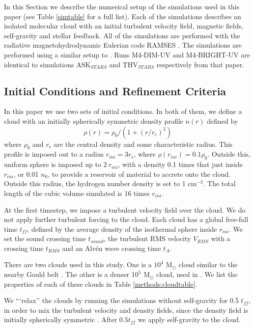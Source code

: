 \documentclass[a4paper,fleqn,usenatbib]{mnras}
\newcommand{\Msolar}{M$_{\odot}$\xspace}
\begin{document}
In this Section we describe the numerical setup of the simulations used in this paper (see Table \ref{simtable} for a full list). Each of the simulations describes an isolated molecular cloud with an initial turbulent velocity field, magnetic fields, self-gravity and stellar feedback. All of the simulations are performed with the radiative magnetohydrodynamic Eulerian \AMR code \textsc{RAMSES} \citep{Teyssier2002,Fromang2006,Rosdahl2013}. The simulations are performed using a similar setup to \citet{Geen2018}. Runs M4-DIM-UV and M4-BRIGHT-UV are identical to simulations ASK$_{STARS}$ and THV$_{STARS}$ respectively from that paper.

\subsection{Initial Conditions and Refinement Criteria}

In this paper we use two sets of initial conditions. In both of them, we define a cloud with an initially spherically symmetric density profile $n(r)$ defined by
\begin{equation}
\rho(r) = \rho_0 / (1 + (r/r_c)^2)
\label{isothermal}
\end{equation}
where $\rho_0$ and $r_c$ are the central density and some characteristic radius. This profile is imposed out to a radius $r_{ini}=3 r_c$, where $\rho(r_{ini})=0.1 \rho_0$. Outside this, uniform sphere is imposed up to $2~r_{ini}$, with a density 0.1 times that just inside $r_{ini}$, or 0.01 $n_0$, to provide a reservoir of material to accrete onto the cloud. Outside this radius, the hydrogen number density is set to 1 cm$^{-3}$. The total length of the cubic volume simulated is 16 times $r_{ini}$.

At the first timestep, we impose a turbulent velocity field over the cloud. We do not apply further turbulent forcing to the cloud. Each cloud has a global free-fall time $t_{ff}$, defined by the average density of the isothermal sphere inside $r_{ini}$. We set the sound crossing time $t_{sound}$, the turbulent RMS velocity $V_{RMS}$ with a crossing time $t_{RMS}$ and an Alv\'en wave crossing time $t_{A}$.

There are two clouds used in this study. One is a $10^4$ \Msolar cloud similar to the nearby Gould belt \citep[see][]{Geen2017}. The other is a denser $10^5$ \Msolar cloud, used in \citet{Geen2016}. We list the properties of each of these clouds in Table \ref{methods:cloudtable}.

We ```relax'' the clouds by running the simulations without self-gravity for 0.5 $t_{ff}$, in order to mix the turbulent velocity and density fields, since the density field is initially spherically symmetric \citep[see][amongst others]{Klessen2000,Lee2016a}. After $0.5 t_{ff}$ we apply self-gravity to the cloud.
\end{document}
